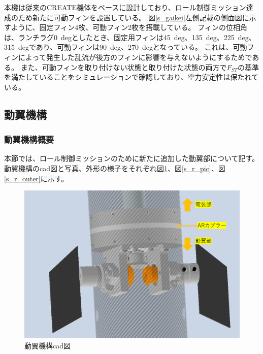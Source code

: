 \documentclass[a4paper,11pt,titlepage,uplatex]{jsarticle}
\begin{document}
本機は従来のCREATE機体をベースに設計しており、ロール制御ミッション達成のため新たに可動フィンを設置している。
図\ref{s_gaikei}左側記載の側面図に示すように、固定フィン4枚、可動フィン2枚を搭載している。
フィンの位相角は、ランチラグ\SI{0}{deg}としたとき、固定用フィンは\SI{45}{deg}、\SI{135}{deg}、\SI{225}{deg}、\SI{315}{deg}であり、可動フィンは\SI{90}{deg}、\SI{270}{deg}となっている。
これは、可動フィンによって発生した乱流が後方のフィンに影響を与えないようにするためである。
また、可動フィンを取り付けない状態と取り付けた状態の両方で$F_{ST}$の基準を満たしていることをシミュレーションで確認しており、空力安定性は保たれている。

\subsection{動翼機構}
\label{douyoku}

\subsubsection{動翼機構概要}本節では、ロール制御ミッションのために新たに追加した動翼部について記す。
動翼機構のcad図と写真、外形の様子をそれぞれ図\ref{s_r_all}、図\ref{s_r_pic}、図\ref{s_r_outer}に示す。

\begin{figure}[H]
    \centering
    \includegraphics[scale = 0.3]{pic_str/s_roll_all.png}
    \caption{動翼機構cad図}
    \label{s_r_all}
\end{figure}
\end{document}

